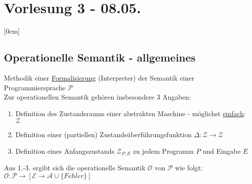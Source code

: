 \section{Vorlesung 3 - 08.05.}
[0cm]
\subsection{Operationelle Semantik - allgemeines}
Methodik einer \underline{Formalisierung} (Interpreter) der Semantik einer Programmiersprache $\mathcal{P}$\\
Zur operationellen Semantik gehören insbesondere 3 Angaben:
\begin{enumerate}
	\item Definition des Zustandsraums einer abstrakten Maschine - möglichst \underline{einfach}: $\mathcal{Z}$
	\item Definition einer (partiellen) Zustandsüberführungsfunktion $\Delta:\mathcal{Z}\rightarrow \mathcal{Z}$
	\item Definition eines Anfangszustands $\mathcal{Z}_{P,E}$ zu jedem Programm $P$ und Eingabe $E$
\end{enumerate}
Aus 1.-3. ergibt sich die operationelle Semantik $\mathcal{O}$  von $\mathcal{P}$ wie folgt:\\
$\mathcal{O}:\mathcal{P}\rightarrow[\mathcal{E}\rightarrow \mathcal{A}\cup \{Fehler\}]$\\

